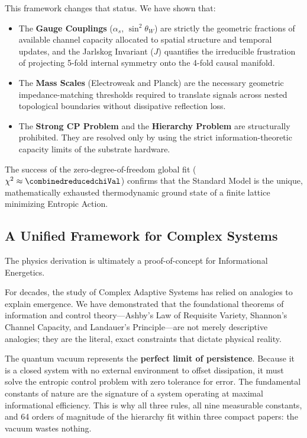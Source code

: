 This framework changes that status. We have shown that:
\begin{itemize}
    \item The \textbf{Gauge Couplings} ($\alpha_s$, $\sin^2 \theta_W$) are strictly the geometric fractions of available channel capacity allocated to spatial structure and temporal updates, and the Jarlskog Invariant ($J$) quantifies the irreducible frustration of projecting 5-fold internal symmetry onto the 4-fold causal manifold.
    \item The \textbf{Mass Scales} (Electroweak and Planck) are the necessary geometric impedance-matching thresholds required to translate signals across nested topological boundaries without dissipative reflection loss.
    \item The \textbf{Strong CP Problem} and the \textbf{Hierarchy Problem} are structurally prohibited. They are resolved only by using the strict information-theoretic capacity limits of the substrate hardware.
\end{itemize}

The success of the zero-degree-of-freedom global fit ($\chi^2 \approx \combinedreducedchiVal$) confirms that the Standard Model is the unique, mathematically exhausted thermodynamic ground state of a finite lattice minimizing Entropic Action.

\subsection{A Unified Framework for Complex Systems}

The physics derivation is ultimately a proof-of-concept for Informational Energetics.

For decades, the study of Complex Adaptive Systems has relied on analogies to explain emergence. We have demonstrated that the foundational theorems of information and control theory---Ashby’s Law of Requisite Variety, Shannon’s Channel Capacity, and Landauer’s Principle---are not merely descriptive analogies; they are the literal, exact constraints that dictate physical reality.

The quantum vacuum represents the \textbf{perfect limit of persistence}. Because it is a closed system with no external environment to offset dissipation, it must solve the entropic control problem with zero tolerance for error. The fundamental constants of nature are the signature of a system operating at maximal informational efficiency. This is why all three rules, all nine measurable constants, and 64 orders of magnitude of the hierarchy fit within three compact papers: the vacuum wastes nothing.

